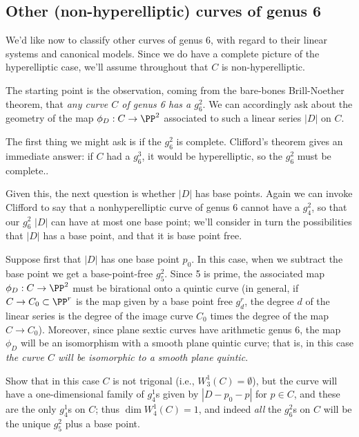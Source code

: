 %

\subsection{Other (non-hyperelliptic) curves of genus 6}

We'd like now to classify other curves of genus 6, with regard to their linear systems and canonical models. Since we do have a complete picture of the hyperelliptic case, we'll assume throughout that $C$ is non-hyperelliptic.

The starting point is the observation, coming from the bare-bones Brill-Noether theorem, that \emph{any curve $C$ of genus 6 has a $g^2_6$}. We can accordingly ask about the geometry of the map $\phi_D : C \to \PP^2$ associated to such a linear series $|D|$ on $C$.

The first thing we might ask is if the $g^2_6$ is complete. Clifford's theorem gives an immediate answer: if $C$ had a $g^3_6$, it would be hyperelliptic, so the $g^2_6$ must be complete..  

Given this, the next question is whether $|D|$ has base points. Again we can invoke Clifford to say that a nonhyperelliptic curve of genus 6 cannot have a $g^2_4$, so that our $g^2_6$ $|D|$ can have at most one base point; we'll consider in turn the possibilities that $|D|$ has a base point, and that it is base point free.

Suppose first that $|D|$ has one base point $p_0$. In this case, when we subtract the base point we get a base-point-free $g^2_5$. Since 5 is prime, the associated map $\phi_D : C \to \PP^2$ must be birational onto a quintic curve (in general, if $C \to C_0 \subset \PP^r$ is the map given by a base point free $g^r_d$, the degree $d$ of the linear series is the degree of the image curve $C_0$ times the degree of the map $C \to C_0$). Moreover, since plane sextic curves have arithmetic genus 6, the map $\phi_D$ will be an isomorphism with a smooth plane quintic curve; that is, in this case \emph{the curve $C$ will be isomorphic to a smooth plane quintic}.

\begin{exercise}
Show that in this case $C$ is not trigonal (i.e., $W^1_3(C) = \emptyset$), but the curve will have a one-dimensional family of $g^1_4$s given by $|D-p_0-p|$ for $p \in C$, and these are the only $g^1_4$s on $C$; thus $\dim W^1_4(C) = 1$, and indeed \emph{all} the $g^2_6$s on $C$ will be the unique $g^2_5$ plus a base point.
\end{exercise} 


